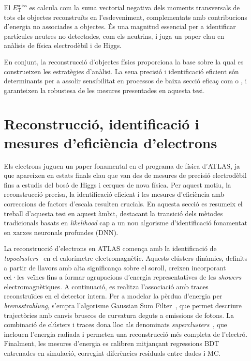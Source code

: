 El $E_{\mathrm{T}}^{\text{miss}}$ es calcula com la suma vectorial negativa dels moments transversals de tots els objectes reconstruïts en l’esdeveniment, complementats amb contribucions d’energia no associades a objectes.  
És una magnitud essencial per a identificar partícules neutres no detectades, com els neutrins, i juga un paper clau en anàlisis de física electrodèbil i de Higgs.  

En conjunt, la reconstrucció d’objectes físics proporciona la base sobre la qual es construeixen les estratègies d’anàlisi.  
La seua precisió i identificació eficient són determinants per a assolir sensibilitat en processos de baixa secció eficaç com \ttH o \thqb, i garanteixen la robustesa de les mesures presentades en aquesta tesi.

\section*{Reconstrucció, identificació i mesures d’eficiència d’electrons}

Els electrons juguen un paper fonamental en el programa de física d’ATLAS, ja que apareixen en estats finals clau que van des de mesures de precisió electrodèbil fins a estudis del bosó de Higgs i cerques de nova física.  
Per aquest motiu, la reconstrucció precisa, la identificació eficient i les mesures d’eficiència amb correccions de factors d’escala resulten crucials.  
En aquesta secció es resumeix el treball d’aquesta tesi en aquest àmbit, destacant la transició dels mètodes tradicionals basats en \textit{likelihood} cap a un nou algorisme d’identificació fonamentat en xarxes neuronals profundes (DNN).  

La reconstrucció d’electrons en ATLAS comença amb la identificació de \textit{topoclusters}~\cite{dyn_clust} en el calorímetre electromagnètic.  
Aquests clústers dinàmics, definits a partir de llavors amb alta significança sobre el soroll, creixen incorporant cel·les veïnes fins a formar agrupacions d’energia representatives de les \textit{showers} electromagnètiques.  
A continuació, es realitza l’associació amb traces reconstruïdes en el detector intern.  
Per a modelar la pèrdua d’energia per \textit{bremsstrahlung}, s’empra l’algorisme Gaussian Sum Filter~\cite{FRUHWIRTH1987444}, que permet descriure trajectòries amb canvis bruscos de curvatura deguts a emissions de fotons.  
La combinació de clústers i traces dona lloc als denominats \textit{superclusters}~\cite{Aad:2684552}, que inclouen l’energia radiada i permeten una reconstrucció més completa de l’electró.  
Finalment, les mesures d’energia es calibren mitjançant regressions BDT entrenades en simulació, corregint diferències residuals entre dades i MC.  

